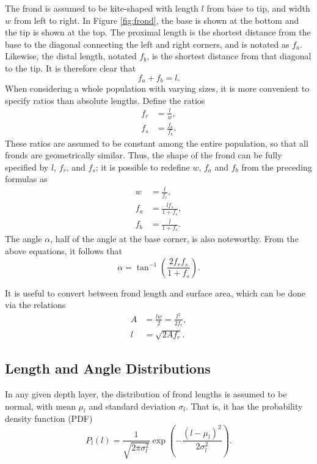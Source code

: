 \documentclass[ms,cpyr,lof,lot]{uathesis}
\providecommand{\DIFaddbegin}{} %
\providecommand{\DIFaddend}{} %
\providecommand{\DIFdelbegin}{} %
\providecommand{\DIFdelend}{} %
\newcommand{\DIFscaledelfig}{0.5}
\newlength{\DIFdelgraphicswidth} %
\newlength{\DIFdelgraphicsheight} %
\newcommand{\DIFaddincludegraphics}[2][]{{\color{blue}\fbox{\DIFOincludegraphics[#1]{#2}}}} %
\newcommand{\DIFdelincludegraphics}[2][]{%
\sbox{\DIFdelgraphicsbox}{\DIFOincludegraphics[#1]{#2}}%
\settoboxwidth{\DIFdelgraphicswidth}{\DIFdelgraphicsbox} %
\settoboxtotalheight{\DIFdelgraphicsheight}{\DIFdelgraphicsbox} %
\scalebox{\DIFscaledelfig}{%
\parbox[b]{\DIFdelgraphicswidth}{\usebox{\DIFdelgraphicsbox}\\[-\baselineskip] \rule{\DIFdelgraphicswidth}{0em}}\llap{\resizebox{\DIFdelgraphicswidth}{\DIFdelgraphicsheight}{%
\setlength{\unitlength}{\DIFdelgraphicswidth}%
\begin{picture}(1,1)%
\thicklines\linethickness{2pt} %
{\color[rgb]{1,0,0}\put(0,0){\framebox(1,1){}}}%
{\color[rgb]{1,0,0}\put(0,0){\line( 1,1){1}}}%
{\color[rgb]{1,0,0}\put(0,1){\line(1,-1){1}}}%
\end{picture}%
}\hspace*{3pt}}} %
} %
\DeclareRobustCommand{\DIFaddbegin}{\DIFOaddbegin \let\includegraphics\DIFaddincludegraphics} %
\DeclareRobustCommand{\DIFaddend}{\DIFOaddend \let\includegraphics\DIFOincludegraphics} %
\DeclareRobustCommand{\DIFdelbegin}{\DIFOdelbegin \let\includegraphics\DIFdelincludegraphics} %
\DeclareRobustCommand{\DIFdelend}{\DIFOaddend \let\includegraphics\DIFOincludegraphics} %
\begin{document}
The frond is assumed to be kite-shaped with length $l$ from base to tip, and width $w$ from left to right.
In Figure \ref{fig:frond}, the base is shown at the bottom and the tip is shown at the top.
The proximal length is the shortest distance from the base to the diagonal connecting the left and right corners, and is notated as $f_a$.
Likewise, the distal length, notated $f_b$, is the shortest distance from that diagonal to the tip.
It is therefore clear that
 \begin{equation*}
	 f_a + f_b = l.
 \end{equation*}
When considering a whole population with varying sizes, it is more convenient to specify ratios than absolute lengths.
Define the ratios
\begin{align*}
	f_r &= \frac{l}{w}, \\
	f_s &= \frac{f_a}{f_b}.
\end{align*}
These ratios are assumed to be constant among the entire population, so that all fronds are geometrically similar.
Thus, the shape of the frond can be fully specified by $l$, $f_r$, and $f_s$;
it is possible to redefine $w$, $f_a$ and $f_b$ from the preceding formulas as
\begin{align*}
	w &= \frac{l}{f_r}, \\
	f_a &= \frac{lf_s}{1+f_s}, \\
	f_b &= \frac{l}{1+f_s}.
\end{align*}
The angle $\alpha$, half of the angle at the base corner, is also noteworthy.
From the above equations, it follows that
\begin{equation*}
	\alpha = \tan^{-1}\left(\frac{2f_rf_s}{1+f_s}\right).
\end{equation*}

It is useful to convert between frond length and surface area, which can be done via the relations
\begin{align}
  A &= \frac{lw}{2} = \frac{l^2}{2f_r},
  \DIFdelbegin %
\DIFdelend \DIFaddbegin \label{eqn:area_from_length} \DIFaddend \\
  l &= \sqrt{2Af_r}.
  \DIFdelbegin %
\DIFdelend \DIFaddbegin \label{eqn:length_from_area}
\DIFaddend \end{align}

\subsection{Length and Angle Distributions}
\label{sec:dist}
In any given depth layer, the distribution of frond lengths is assumed to be normal, with mean $\mu_l$ and standard deviation $\sigma_l$.
That is, it has the probability density function (PDF)
\begin{equation*}
  P_l(l) = \frac{1}{\sqrt{2\pi\sigma_l^2}}\exp\left(-\frac{(l-\mu_l)^2}{2\sigma_l^2}\right).
\end{equation*}
\end{document}
